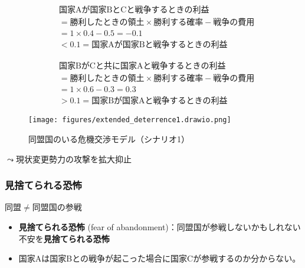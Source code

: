 \documentclass[
  xelatex,
  ja=standard]{bxjsarticle}
\providecommand{\tightlist}{%
  \setlength{\itemsep}{0pt}\setlength{\parskip}{0pt}}\usepackage{longtable,booktabs,array}
\begin{document}
\[
\begin{split}
&\textrm{国家Aが国家BとCと戦争するときの利益} \\
&= \textrm{勝利したときの領土} \times \textrm{勝利する確率} - \textrm{戦争の費用} \\
&= 1 \times 0.4 - 0.5 = -0.1 \\
&< 0.1 = \textrm{国家Aが国家Bと戦争するときの利益}
\end{split}
\]

\[
\begin{split}
&\textrm{国家BがCと共に国家Aと戦争するときの利益} \\
&= \textrm{勝利したときの領土} \times \textrm{勝利する確率} - \textrm{戦争の費用} \\
&= 1 \times 0.6 - 0.3 = 0.3 \\
&> 0.1 = \textrm{国家Bが国家Aと戦争するときの利益}
\end{split}
\]

\begin{figure}[htpb]

{\centering \texttt{[image: figures/extended\_deterrence1.drawio.png]}

}

\caption{同盟国のいる危機交渉モデル（シナリオ1）}

\end{figure}

\(\leadsto\)現状変更勢力の攻撃を拡大抑止

\hypertarget{ux898bux6368ux3066ux3089ux308cux308bux6050ux6016}{%
\subsubsection{見捨てられる恐怖}\label{ux898bux6368ux3066ux3089ux308cux308bux6050ux6016}}

同盟\(\neq\)同盟国の参戦

\begin{itemize}
\tightlist
\item
  \textbf{見捨てられる恐怖} (fear of
  abandonment)：同盟国が参戦しないかもしれない不安を\textbf{見捨てられる恐怖}\citep{snyder1984}
\end{itemize}

\begin{tcolorbox}[enhanced jigsaw, opacityback=0, leftrule=.75mm, toptitle=1mm, colframe=quarto-callout-tip-color-frame, arc=.35mm, bottomrule=.15mm, coltitle=black, bottomtitle=1mm, colbacktitle=quarto-callout-tip-color!10!white, titlerule=0mm, breakable, title=\textcolor{quarto-callout-tip-color}{\faLightbulb}\hspace{0.5em}{同盟国のいる国際危機のシナリオ1'}, left=2mm, rightrule=.15mm, toprule=.15mm, opacitybacktitle=0.6, colback=white]

\begin{itemize}
\tightlist
\item
  国家Aは国家Bとの戦争が起こった場合に国家Cが参戦するのか分からない。
\end{itemize}

\end{tcolorbox}
\end{document}
